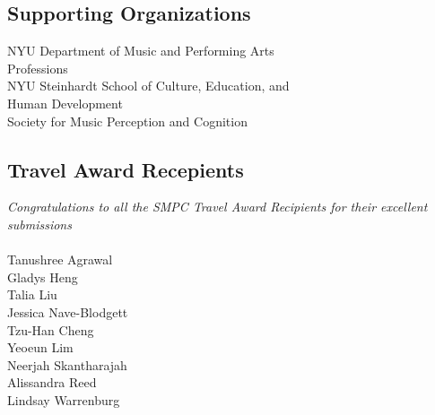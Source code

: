 \begin{multicols}{2}
\subsection*{Supporting Organizations}
NYU Department of Music and Performing Arts \\
\indent Professions\\
NYU Steinhardt School of Culture, Education, and \\
\indent Human Development\\
Society for Music Perception and Cognition

\subsection*{Travel Award Recepients}
\textit{Congratulations to all the SMPC Travel Award Recipients for their excellent submissions}\\\\
\indent Tanushree Agrawal\\
\indent Gladys Heng\\
\indent Talia Liu\\
\indent Jessica Nave-Blodgett\\
\indent Tzu-Han Cheng\\
\indent Yeoeun Lim\\
\indent Neerjah Skantharajah\\
\indent Alissandra Reed\\
\indent Lindsay Warrenburg\\
\end{multicols}

